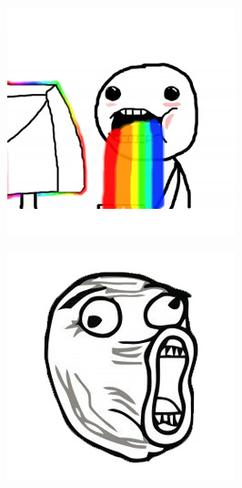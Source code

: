 \begin{multicols}{8}
\begin{center}
\includegraphics[width=\linewidth]{./IMG-GIT/MEMES/Meme-Faces-39.jpg}  
\end{center}

\begin{center}
\includegraphics[width=\linewidth]{./IMG-GIT/MEMES/Meme-Faces-4.jpg}   
\end{center}


\end{multicols}

